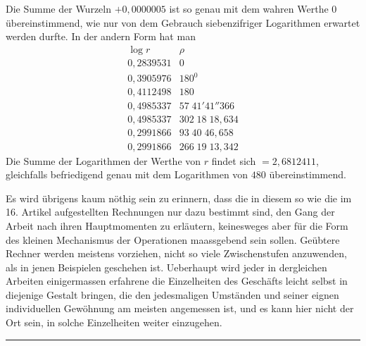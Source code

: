Die Summe der Wurzeln $+0{,}0000005$ ist so genau mit dem wahren
Werthe $0$ übereinstimmend, wie nur von dem Gebrauch siebenzifriger
Logarithmen erwartet werden durfte. In der andern Form hat man
\[
\begin{array}{r|r}
\log r&\rho\\\hline
0{,}2839531&0\\
0{,}3905976&180^{0}\\
0{,}4112498&180\\
0{,}4985337&57\;41'41''366\\
0{,}4985337&302\;18\;18{,}634\\
0{,}2991866&93\;40\;46{,}658\\
0{,}2991866&266\;19\;13{,}342
\end{array}
\]
Die Summe der Logarithmen der Werthe von $r$ findet sich
$=2{,}6812411$, gleichfalls befriedigend genau mit dem Logarithmen
von $480$ übereinstimmend.

Es wird übrigens kaum nöthig sein zu erinnern, dass die in diesem so
wie die im 16. Artikel aufgestellten Rechnungen nur dazu bestimmt
sind, den Gang der Arbeit nach ihren Hauptmomenten zu erläutern,
keinesweges aber für die Form des kleinen Mechanismus der Operationen
maassgebend sein sollen. Geübtere Rechner werden meistens vorziehen,
nicht so viele Zwischenstufen anzuwenden, als in jenen Beispielen
geschehen ist. Ueberhaupt wird jeder in dergleichen Arbeiten
einigermassen erfahrene die Einzelheiten des Geschäfts leicht selbst
in diejenige Gestalt bringen, die den jedesmaligen Umständen und
seiner eignen individuellen Gewöhnung am meisten angemessen ist,
und es kann hier nicht der Ort sein, in solche Einzelheiten weiter
einzugehen.
\begin{center}\rule{0.25\linewidth}{0.3pt}\end{center}
